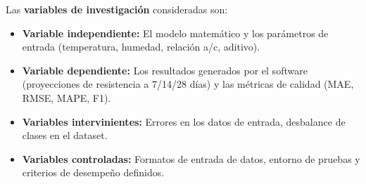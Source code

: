 Las \textbf{variables de investigación} consideradas son:
\begin{itemize}
    \item \textbf{Variable independiente:} El modelo matemático y los parámetros de entrada (temperatura, humedad, relación a/c, aditivo).
    \item \textbf{Variable dependiente:} Los resultados generados por el software (proyecciones de resistencia a 7/14/28 días) y las métricas de calidad (MAE, RMSE, MAPE, F1).
    \item \textbf{Variables intervinientes:} Errores en los datos de entrada, desbalance de clases en el dataset.
    \item \textbf{Variables controladas:} Formatos de entrada de datos, entorno de pruebas y criterios de desempeño definidos.
\end{itemize}
